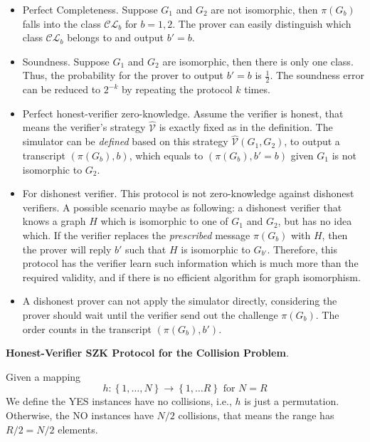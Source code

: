 \documentclass{article}
\begin{document}
\begin{itemize}
\item Perfect Completeness. Suppose $G_1$ and $G_2$ are not isomorphic, then $\pi(G_{b})$ falls into the class $\mathcal{CL}_{b}$ for $b = 1, 2$. The prover can easily distinguish which class $\mathcal{CL}_b$ belongs to and output $b' = b$. 
\item Soundness. Suppose $G_1$ and $G_2$ are isomorphic, then there is only one class. Thus, the probability for the prover to output $b' = b$ is $\frac{1}{2}$. The soundness error can be reduced to $2^{-k}$ by repeating the protocol $k$ times. 
\item Perfect honest-verifier zero-knowledge. Assume the verifier is honest, that means the verifier's strategy $\hat{\mathcal{V}}$ is exactly fixed as in the definition. The simulator can be \textit{defined} based on this strategy $\hat{\mathcal{V}}(G_1, G_2)$, to output a transcript $\left( \pi(G_b), b \right)$, which equals to $\left( \pi(G_b), b'=b \right)$ given $G_1$ is not isomorphic to $G_2$. 
\item For dishonest verifier. This protocol is not zero-knowledge against dishonest verifiers. A possible scenario maybe as following: a dishonest verifier that knows a graph $H$ which is isomorphic to one of $G_1$ and $G_2$, but has no idea which. If the verifier replaces the \textit{prescribed} message $\pi(G_b)$ with $H$, then the prover will reply $b'$ such that $H$ is isomorphic to $G_{b'}$. Therefore, this protocol has the verifier learn such information which is much more than the required validity, and if there is no efficient algorithm for graph isomorphism. 
\item A dishonest prover can not apply the simulator directly, considering the prover should wait until the verifier send out the challenge $\pi(G_b)$. The order counts in the transcript $\left( \pi(G_b), b' \right)$.
\end{itemize}

\textbf{Honest-Verifier SZK Protocol for the Collision Problem}. 


\begin{boxx1}
Given a mapping
\begin{equation*}
h: \left\{ 1, \dots, N \right\} \rightarrow \left\{ 1, \dots R \right\} \text{ for } N = R
\end{equation*}
We define the \textsf{YES} instances have no collisions, i.e., $h$ is just a permutation. Otherwise, the \textsf{NO} instances have $N/2$ collisions, that means the range has $R/2 = N/2$ elements.
\end{boxx1}
\end{document}
